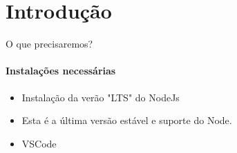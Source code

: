 \documentclass{beamer}
\begin{document}
    \section{Introdução}
    \begin{frame}{O que precisaremos?}
      \framesubtitle{Instalações necessárias}%
      
      \begin{itemize}
            \item Instalação da verão "LTS" do NodeJs
            \item Esta é a última versão estável e suporte do Node.
            \item VSCode
       \end{itemize}
     \end{frame}

\end{document}
